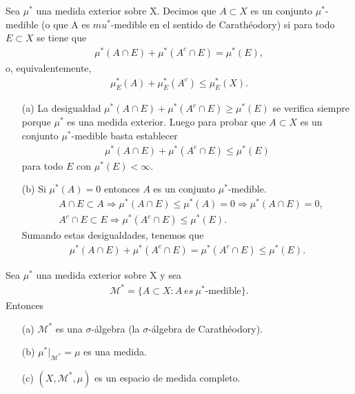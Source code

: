 \begin{defi}
Sea $\mu^*$ una medida exterior sobre X. Decimos que $A \subset X$ es un conjunto $\mu^*$-medible (o que A es $mu^*$-medible en el sentido de Carathéodory) si para todo $E \subset X$ se tiene que
\begin{align*}
    \mu^*(A \cap E) + \mu^*(A^c \cap E) = \mu^*(E),
\end{align*}
o, equivalentemente,
\begin{align*}
    \mu_{E}^*(A) + \mu_{E}^*(A^c) \leq \mu_{E}^*(X).
\end{align*}
\end{defi}

\begin{obs}
\begin{enumerate}
    \item[(a)] La desigualdad $\mu^*(A \cap E) + \mu^*(A^c \cap E) \ge \mu^*(E)$ se verifica siempre porque $\mu^*$ es una medida exterior. Luego para probar que $A \subset X$ es un conjunto $\mu^*$-medible basta establecer
    \begin{align*}
        \mu^*(A \cap E) + \mu^*(A^c \cap E) \leq \mu^*(E)
    \end{align*}
    para todo $E$ con $\mu^*(E) < \infty$.
    \item[(b)] Si $\mu^*(A) = 0$ entonces $A$ es un conjunto $\mu^*$-medible.
    \begin{align*}
        &A \cap E \subset A \Longrightarrow \mu^*(A \cap E) \leq \mu^*(A) = 0 \Longrightarrow \mu^*(A \cap E) = 0, \\
        &A^c \cap E \subset E \Longrightarrow \mu^*(A^c \cap E) \leq \mu^*(E).
    \end{align*}
    Sumando estas desigualdades, tenemos que
    \begin{align*}
        \mu^*(A \cap E) + \mu^*(A^c \cap E) = \mu^*(A^c \cap E) \leq \mu^*(E).
    \end{align*}
\end{enumerate}
\end{obs}

\begin{teo}
Sea $\mu^*$ una medida exterior sobre X y sea
\begin{align*}
    \mathcal{M}^* = \{ A \subset X : A \ es \ \mu^*\text{-medible} \}.
\end{align*}
Entonces
\begin{enumerate}
    \item[(a)] $\mathcal{M}^*$ es una $\sigma$-álgebra (la $\sigma$-álgebra de Carathéodory).
    \item[(b)] $\mu^*|_{\mathcal{M}^*} = \mu$ es una medida.
    \item[(c)] $(X, \mathcal{M}^*, \mu)$ es un espacio de medida completo.
\end{enumerate}
\end{teo}

